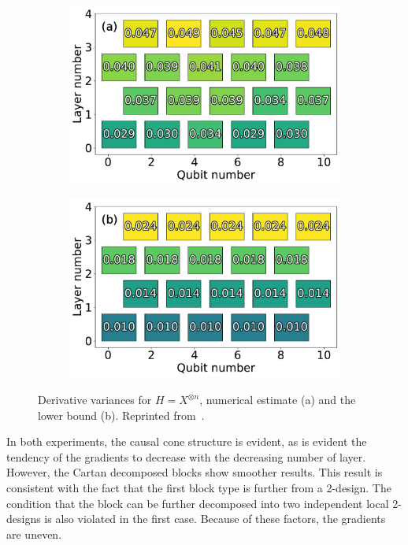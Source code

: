 \begin{figure}
    \centering
    \begin{subfigure}{.48\linewidth}
        \centering
        \includegraphics[width=\linewidth]{figures/dense_cartan.pdf}
    \end{subfigure}
    \begin{subfigure}{.48\linewidth}
        \centering
        \includegraphics[width=\linewidth]{figures/dense_theory.pdf}
    \end{subfigure}
    \caption{Derivative variances for $H = X^{\otimes n}$, numerical estimate (a) and the lower bound (b). Reprinted from~\cite{uvarov_barren_2021}.}
    \label{fig:n-local}
\end{figure}

In both experiments, the causal cone structure is evident, as is evident the tendency of the gradients to decrease with the decreasing number of layer. However, the Cartan decomposed blocks show smoother results. This result is consistent with the fact that the first block type is further from a 2-design. The condition that the block can be further decomposed into two independent local 2-designs is also violated in the first case. Because of these factors, the gradients are uneven.

